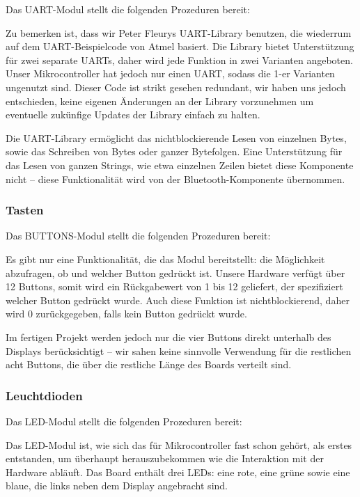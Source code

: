 \documentclass[ngerman]{article}
\begin{document}
Das UART-Modul stellt die folgenden Prozeduren bereit:



Zu bemerken ist, dass wir Peter Fleurys UART-Library benutzen, die wiederrum
auf dem UART-Beispielcode von Atmel basiert. Die Library bietet Unterstützung
für zwei separate UARTs, daher wird jede Funktion in zwei Varianten angeboten.
Unser Mikrocontroller hat jedoch nur einen UART, sodass die 1-er Varianten
ungenutzt sind. Dieser Code ist strikt gesehen redundant, wir haben uns jedoch
entschieden, keine eigenen Änderungen an der Library vorzunehmen um eventuelle
zukünfige Updates der Library einfach zu halten.

Die UART-Library ermöglicht das nichtblockierende Lesen von einzelnen Bytes,
sowie das Schreiben von Bytes oder ganzer Bytefolgen. Eine Unterstützung für
das Lesen von ganzen Strings, wie etwa einzelnen Zeilen bietet diese Komponente
nicht -- diese Funktionalität wird von der Bluetooth-Komponente übernommen.

\subsubsection{Tasten}

Das BUTTONS-Modul stellt die folgenden Prozeduren bereit:



Es gibt nur eine Funktionalität, die das Modul bereitstellt: die Möglichkeit
abzufragen, ob und welcher Button gedrückt ist. Unsere Hardware verfügt über 12
Buttons, somit wird ein Rückgabewert von 1 bis 12 geliefert, der spezifiziert
welcher Button gedrückt wurde. Auch diese Funktion ist nichtblockierend, daher
wird 0 zurückgegeben, falls kein Button gedrückt wurde.

Im fertigen Projekt werden jedoch nur die vier Buttons direkt unterhalb des
Displays berücksichtigt -- wir sahen keine sinnvolle Verwendung für die
restlichen acht Buttons, die über die restliche Länge des Boards verteilt sind.

\subsubsection{Leuchtdioden}

Das LED-Modul stellt die folgenden Prozeduren bereit:



Das LED-Modul ist, wie sich das für Mikrocontroller fast schon gehört, als
erstes entstanden, um überhaupt herauszubekommen wie die Interaktion mit
der Hardware abläuft. Das Board enthält drei LEDs: eine rote, eine grüne
sowie eine blaue, die links neben dem Display angebracht sind.
\end{document}
